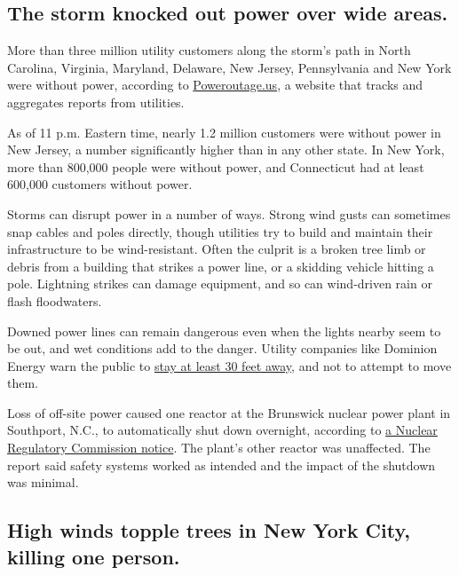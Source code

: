 \hypertarget{the-storm-knocked-out-power-over-wide-areas}{%
\subsection{The storm knocked out power over wide
areas.}\label{the-storm-knocked-out-power-over-wide-areas}}

More than three million utility customers along the storm's path in
North Carolina, Virginia, Maryland, Delaware, New Jersey, Pennsylvania
and New York were without power, according to
\href{https://poweroutage.us/}{Poweroutage.us}, a website that tracks
and aggregates reports from utilities.

As of 11 p.m. Eastern time, nearly 1.2 million customers were without
power in New Jersey, a number significantly higher than in any other
state. In New York, more than 800,000 people were without power, and
Connecticut had at least 600,000 customers without power.

Storms can disrupt power in a number of ways. Strong wind gusts can
sometimes snap cables and poles directly, though utilities try to build
and maintain their infrastructure to be wind-resistant. Often the
culprit is a broken tree limb or debris from a building that strikes a
power line, or a skidding vehicle hitting a pole. Lightning strikes can
damage equipment, and so can wind-driven rain or flash floodwaters.

Downed power lines can remain dangerous even when the lights nearby seem
to be out, and wet conditions add to the danger. Utility companies like
Dominion Energy warn the public to
\href{https://twitter.com/DominionEnergy/status/1290609115954323457}{stay
at least 30 feet away}, and not to attempt to move them.

Loss of off-site power caused one reactor at the Brunswick nuclear power
plant in Southport, N.C., to automatically shut down overnight,
according to
\href{https://www.nrc.gov/reading-rm/doc-collections/event-status/event/2020/20200804en.html}{a
Nuclear Regulatory Commission notice}. The plant's other reactor was
unaffected. The report said safety systems worked as intended and the
impact of the shutdown was minimal.

\hypertarget{high-winds-topple-trees-in-new-york-city-killing-one-person}{%
\subsection{High winds topple trees in New York City, killing one
person.}\label{high-winds-topple-trees-in-new-york-city-killing-one-person}}

